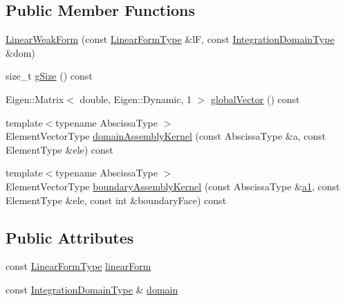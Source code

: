 \subsection*{Public Member Functions}
\begin{DoxyCompactItemize}
\item 
\hyperlink{classmodel_1_1_linear_weak_form_a178e12a54670fe4388ecf65de97f4baa}{Linear\+Weak\+Form} (const \hyperlink{classmodel_1_1_linear_weak_form_a615022ae48cb4a4bdb80eaa954bf5e1e}{Linear\+Form\+Type} \&l\+F, const \hyperlink{classmodel_1_1_linear_weak_form_a5a2c3fddd71479eb47af0c4ec7657b0a}{Integration\+Domain\+Type} \&dom)
\item 
size\+\_\+t \hyperlink{classmodel_1_1_linear_weak_form_aab252ca0e7a53dcb76836fe35dd8de64}{g\+Size} () const 
\item 
Eigen\+::\+Matrix$<$ double, Eigen\+::\+Dynamic, 1 $>$ \hyperlink{classmodel_1_1_linear_weak_form_af56267e03e64d4b64ef57bbeec5b7aaa}{global\+Vector} () const 
\item 
{\footnotesize template$<$typename Abscissa\+Type $>$ }\\Element\+Vector\+Type \hyperlink{classmodel_1_1_linear_weak_form_a608275e71da89d787776ac8e82facaea}{domain\+Assembly\+Kernel} (const Abscissa\+Type \&a, const Element\+Type \&ele) const 
\item 
{\footnotesize template$<$typename Abscissa\+Type $>$ }\\Element\+Vector\+Type \hyperlink{classmodel_1_1_linear_weak_form_abac2f9827f8c37a77efbfd2710fa52da}{boundary\+Assembly\+Kernel} (const Abscissa\+Type \&\hyperlink{run_multipole_8m_a8dbb40f7f7bb5a67b98c95563ac0f086}{a1}, const Element\+Type \&ele, const int \&boundary\+Face) const 
\end{DoxyCompactItemize}
\subsection*{Public Attributes}
\begin{DoxyCompactItemize}
\item 
const \hyperlink{classmodel_1_1_linear_weak_form_a615022ae48cb4a4bdb80eaa954bf5e1e}{Linear\+Form\+Type} \hyperlink{classmodel_1_1_linear_weak_form_a3da50f998ad52d2fe77ebd41c60af146}{linear\+Form}
\item 
const \hyperlink{classmodel_1_1_linear_weak_form_a5a2c3fddd71479eb47af0c4ec7657b0a}{Integration\+Domain\+Type} \& \hyperlink{classmodel_1_1_linear_weak_form_af1fa854a6b2b1504a761281fbf9629c7}{domain}
\end{DoxyCompactItemize}
